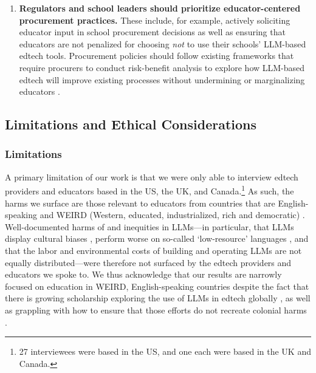 \begin{enumerate}
    \item \textbf{Regulators and school leaders should prioritize educator-centered procurement practices.} These include, for example, actively soliciting educator input in school procurement decisions as well as ensuring that educators are not penalized for choosing \textit{not} to use their schools' LLM-based edtech tools. Procurement policies should follow existing frameworks that require procurers to conduct risk-benefit analysis to explore how LLM-based edtech will improve existing processes without undermining or marginalizing educators \cite[e.g.,][]{noauthor_ethical_2021}.
    \end{enumerate}

\subsection{Limitations and Ethical Considerations}\label{s-limitations}
\subsubsection*{Limitations} A primary limitation of our work is that we were only able to interview edtech providers and educators based in the US, the UK, and Canada.\footnote{27 interviewees were based in the US, and one each were based in the UK and Canada.} As such, the harms we surface are those relevant to educators from countries that are English-speaking and WEIRD (Western, educated, industrialized, rich and democratic) \cite{Henrich_Heine_Norenzayan_2010}. Well-documented harms of and inequities in LLMs---in particular, that LLMs display cultural biases \cite{tao2024culturalbiasculturalalignment}, perform worse on so-called `low-resource' languages \cite{nicholas_lost_2023, joshi-etal-2020-state}, and that the labor \cite{noema_workers, wsj_workers} and environmental \cite{png_2022_tensions} costs of building and operating LLMs are not equally distributed---were therefore not surfaced by the edtech providers and educators we spoke to. We thus acknowledge that our results are narrowly focused on education in WEIRD, English-speaking countries despite the fact that there is growing scholarship exploring the use of LLMs in edtech globally \cite{henkel2024effective, choi2024llms}, as well as grappling with how to ensure that those efforts do not recreate colonial harms \cite{Shahjahan_decolonizing_2022, ogunremi_decolonizing_2023, bird_decolonising_2020}.

